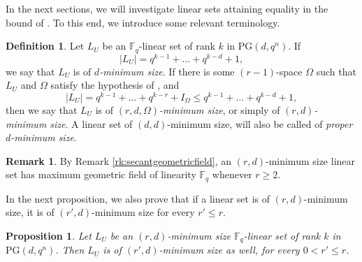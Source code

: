 \documentclass[11pt]{article}
\newtheorem{proposition}[theorem]{Proposition}
\theoremstyle{definition}
\newtheorem{definition}[theorem]{Definition}
\newtheorem{remark}[theorem]{Remark}
\newcommand{\F}{{\mathbb F}}
\newcommand{\fq}{{\mathbb F}_{q}}
\newcommand{\PG}{\mathrm{PG}}
\begin{document}
In the next sections, we will investigate linear sets attaining equality in the bound of .
To this end, we introduce some relevant terminology.

\begin{definition}
Let $L_U$ be an $\fq$-linear set of rank $k$ in $\PG(d,q^n)$.
If
\[
 |L_U| = q^{k-1} + \ldots + q^{k-d} + 1,
\]
we say that $L_U$ is of \emph{$d$-minimum size}.
If there is some $(r-1)$-space $\Omega$ such that $L_U$ and $\Omega$ satisfy the hypothesis of , and
\begin{equation*}
 |L_U| = q^{k-1} + \ldots + q^{k-r} + I_\Omega
 \leq q^{k-1} + \ldots + q^{k-d} + 1,
\end{equation*}
then we say that $L_U$ is of \emph{$(r,d,\Omega)$-minimum size}, or simply of \emph{$(r,d)$-minimum size}.
A linear set of $(d,d)$-minimum size, will also be called of \emph{proper $d$-minimum size}.
\end{definition}

\begin{remark} \label{rk:geometricfieldminimum}
By Remark \ref{rk:secantgeometricfield}, an $(r,d)$-minimum size linear set has maximum geometric field of linearity  $\F_q$ whenever $r \geq 2$.
\end{remark}

In the next proposition, we also prove that if a linear set is of $(r,d)$-minimum size, it is of $(r',d)$-minimum size for every $r' \leq r$.

\begin{proposition}
Let $L_U$ be an $(r,d)$-minimum size $\F_q$-linear set of rank $k$ in $\PG(d,q^n)$.
Then $L_U$ is of $(r',d)$-minimum size as well, for every $0 < r' \leq r$.    
\end{proposition}
\end{document}
